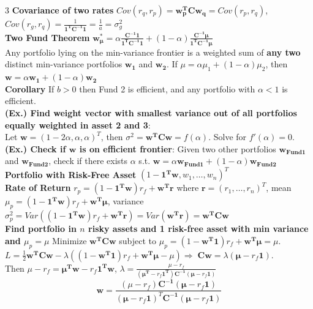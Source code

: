 \documentclass{article}
\begin{document}
{\begin{multicols*}{3}
\textbf{Covariance of two rates} $Cov(r_q,r_p)=\boldsymbol{w_p^TCw_q}=Cov(r_p,r_q)$, $Cov(r_g,r_q)=\frac{1}{\boldsymbol{1^TC^{-1}1}}=\frac{1}{a}=\sigma_g^2$\\
\textbf{Two Fund Theorem} $\boldsymbol{w_\mu^*}=\alpha\frac{\boldsymbol{C^{-1}1}}{\boldsymbol{1^TC^{-1}1}}+(1-\alpha) \frac{\boldsymbol{C^{-1}\mu}}{\boldsymbol{1^TC^{-1}\mu}}$ \\ 
Any portfolio lying on the min-variance frontier is a weighted sum of \textbf{any two} distinct min-variance portfolios $\boldsymbol{w_1}$ and $\boldsymbol{w_2}$. If $\mu=\alpha\mu_1+(1-\alpha)\mu_2$, then $\boldsymbol{w}=\alpha\boldsymbol{w_1}+(1-\alpha)\boldsymbol{w_2}$ \\
\textbf{Corollary} If $b>0$ then Fund 2 is efficient, and any portfolio with $\alpha<1$ is efficient.\\
\textbf{(Ex.) Find weight vector with smallest variance out of all portfolios equally weighted in asset 2 and 3}: \\
Let $\boldsymbol{w}=(1-2\alpha,\alpha,\alpha)^T$, then $\sigma^2=\boldsymbol{w^TCw}=f(\alpha)$. Solve for $f'(\alpha)=0$.\\
\textbf{(Ex.) Check if $\boldsymbol{w}$ is on efficient frontier}: Given two other portfolios $\boldsymbol{w_{Fund1}}$ and $\boldsymbol{w_{Fund2}}$, check if there exists $\alpha$ s.t. $\boldsymbol{w}=\alpha\boldsymbol{w_{Fund1}}+(1-\alpha)\boldsymbol{w_{Fund2}}$\\
\textbf{Portfolio with Risk-Free Asset} $(1-\boldsymbol{1^Tw}, w_1,\dots,w_n)^T$\\
\textbf{Rate of Return} $r_p=(1-\boldsymbol{1^Tw})r_f+\boldsymbol{w^Tr}$ where $\boldsymbol{r}=(r_1,\dots,r_n)^T$, mean $\mu_p=(1-\boldsymbol{1^Tw})r_f+\boldsymbol{w^T\mu}$, variance $\sigma_p^2=Var((1-\boldsymbol{1^Tw})r_f+\boldsymbol{w^Tr})=Var(\boldsymbol{w^Tr})=\boldsymbol{w^TCw}$\\
\textbf{Find portfolio in $n$ risky assets and 1 risk-free asset with min variance and $\mu_p=\mu$} Minimize $\boldsymbol{w^TCw}$ subject to $\mu_p=(1-\boldsymbol{w^T1})r_f+\boldsymbol{w^T\mu}=\mu$. $L=\frac{1}{2}\boldsymbol{w^TCw}-\lambda((1-\boldsymbol{w^T1})r_f+\boldsymbol{w^T\mu}-\mu)\Longrightarrow\;\boldsymbol{Cw}=\lambda(\boldsymbol{\mu}-r_f\boldsymbol{1})$. \\ Then $\mu-r_f=\boldsymbol{\mu^Tw}-r_f\boldsymbol{1^Tw}$, $\lambda=\frac{\mu-r_f}{(\boldsymbol{\mu^T}-r_f\boldsymbol{1^T})\boldsymbol{C^{-1}}(\boldsymbol{\mu}-r_f\boldsymbol{1})}$ 
$$\boldsymbol{w}=\frac{(\mu-r_f)\boldsymbol{C^{-1}}(\boldsymbol{\mu}-r_f\boldsymbol{1})}{(\boldsymbol{\mu}-r_f\boldsymbol{1})^T\boldsymbol{C^{-1}}(\boldsymbol{\mu}-r_f\boldsymbol{1})}$$

\end{multicols*}}
\end{document}
